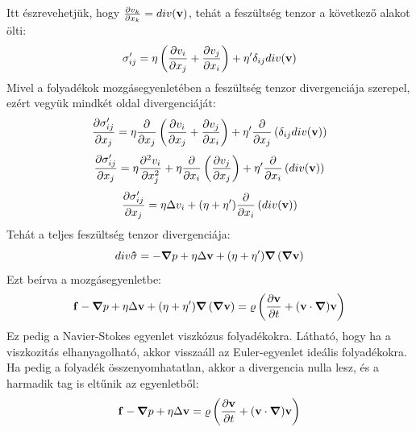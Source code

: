 \documentclass[a4paper,12pt]{article}
\begin{document}
Itt észrevehetjük, hogy $\frac{\partial v_k}{\partial x_k} = div(\bold{v})$, tehát a feszültség tenzor a következő alakot ölti:
\begin{equation}
    \sigma_{ij}' = \eta \left(\frac{\partial v_i}{\partial x_j} + \frac{\partial v_j}{\partial x_i}\right) + \eta' \delta_{ij} div(\bold{v})
\end{equation}
Mivel a folyadékok mozgásegyenletében a feszültség tenzor divergenciája szerepel, ezért vegyük mindkét oldal divergenciáját:
\begin{equation}
    \frac{\partial \sigma_{ij}'}{\partial x_j} = \eta \frac{\partial}{\partial x_j} \left(\frac{\partial v_i}{\partial x_j} + \frac{\partial v_j}{\partial x_i}\right) + \eta' \frac{\partial}{\partial x_j} \left(\delta_{ij} div(\bold{v})\right)
\end{equation}
\begin{equation}
    \frac{\partial \sigma_{ij}'}{\partial x_j} = \eta \frac{\partial^2 v_i}{\partial x_j^2} + \eta \frac{\partial}{\partial x_i} \left(\frac{\partial v_j}{\partial x_j}\right) + \eta' \frac{\partial}{\partial x_i} \left(div(\bold{v})\right)
\end{equation}
\begin{equation}
    \frac{\partial \sigma_{ij}'}{\partial x_j} = \eta \Delta v_i + (\eta + \eta') \frac{\partial}{\partial x_i} \left(div(\bold{v})\right)
\end{equation}
Tehát a teljes feszültség tenzor divergenciája:
\begin{equation}
    div \bold{\hat{\sigma}} = - \boldsymbol{\nabla} p + \eta \Delta \bold{v} + (\eta + \eta')  \boldsymbol{\nabla}\left(\boldsymbol{\nabla} \bold{v}\right)
\end{equation}
Ezt beírva a mozgásegyenletbe:
\begin{equation}
    \bold{f} - \boldsymbol{\nabla} p + \eta \Delta \bold{v} + (\eta + \eta')  \boldsymbol{\nabla}\left(\boldsymbol{\nabla} \bold{v}\right) = \varrho \left(\frac{\partial \bold{v}}{\partial t} + (\bold{v} \cdot \boldsymbol{\nabla}) \bold{v}\right)
\end{equation}
Ez pedig a Navier-Stokes egyenlet viszkózus folyadékokra.
Látható, hogy ha a viszkozitás elhanyagolható, akkor visszaáll az Euler-egyenlet ideális folyadékokra. Ha pedig a folyadék összenyomhatatlan,
akkor a divergencia nulla lesz, és a harmadik tag is eltűnik az egyenletből:
\begin{equation}
    \bold{f} - \boldsymbol{\nabla} p + \eta \Delta \bold{v} = \varrho \left(\frac{\partial \bold{v}}{\partial t} + (\bold{v} \cdot \boldsymbol{\nabla}) \bold{v}\right)
\end{equation}
\end{document}
